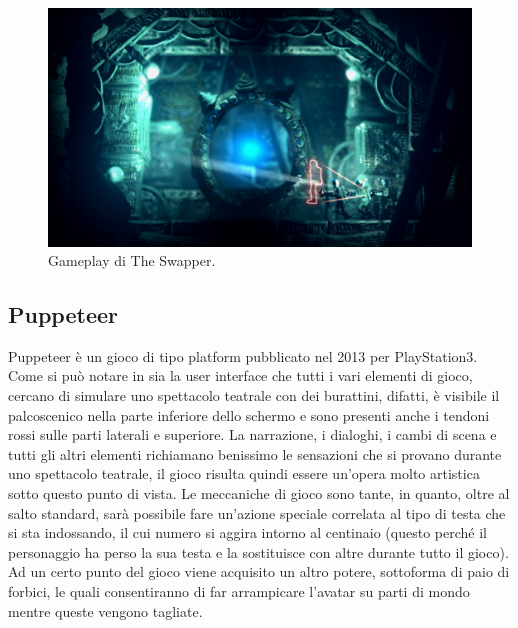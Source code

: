 \begin{figure}[h]
\centerline{\includegraphics[scale=0.3]{images/statoarte/tsgameplay.png}}
\caption{Gameplay di The Swapper.}
\label{fig:pgameplay}
\end{figure}


\subsection{Puppeteer}

Puppeteer è un gioco di tipo platform pubblicato nel 2013 per PlayStation3. Come si può notare in \myfig{\ref{fig:pgameplay}} sia la user interface che tutti i vari elementi di gioco, cercano di simulare uno spettacolo teatrale con dei burattini, difatti, è visibile il palcoscenico nella parte inferiore dello schermo e sono presenti anche i tendoni rossi sulle parti laterali e superiore. La narrazione, i dialoghi, i cambi di scena e tutti gli altri elementi richiamano benissimo le sensazioni che si provano durante uno spettacolo teatrale, il gioco risulta quindi essere un'opera molto artistica sotto questo punto di vista. Le meccaniche di gioco sono tante, in quanto, oltre al salto standard, sarà possibile fare un'azione speciale correlata al tipo di testa che si sta indossando, il cui numero si aggira intorno al centinaio (questo perché il personaggio ha perso la sua testa e la sostituisce con altre durante tutto il gioco). Ad un certo punto del gioco viene acquisito un altro potere, sottoforma di paio di forbici, le quali consentiranno di far arrampicare l'avatar su parti di mondo mentre queste vengono tagliate.

